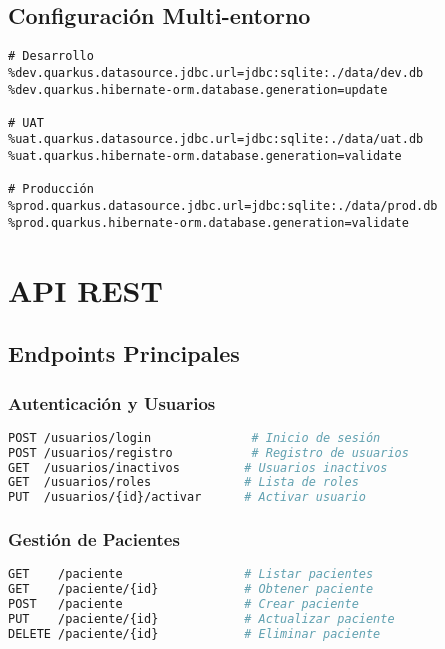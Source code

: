 \documentclass[12pt,a4paper]{article}
\begin{document}
\subsection{Configuración Multi-entorno}

\begin{lstlisting}[language=properties]
# Desarrollo
%dev.quarkus.datasource.jdbc.url=jdbc:sqlite:./data/dev.db
%dev.quarkus.hibernate-orm.database.generation=update

# UAT
%uat.quarkus.datasource.jdbc.url=jdbc:sqlite:./data/uat.db
%uat.quarkus.hibernate-orm.database.generation=validate

# Producción
%prod.quarkus.datasource.jdbc.url=jdbc:sqlite:./data/prod.db
%prod.quarkus.hibernate-orm.database.generation=validate
\end{lstlisting}

\section{API REST}

\subsection{Endpoints Principales}

\subsubsection{Autenticación y Usuarios}
\begin{lstlisting}[language=bash]
POST /usuarios/login              # Inicio de sesión
POST /usuarios/registro           # Registro de usuarios
GET  /usuarios/inactivos         # Usuarios inactivos
GET  /usuarios/roles             # Lista de roles
PUT  /usuarios/{id}/activar      # Activar usuario
\end{lstlisting}

\subsubsection{Gestión de Pacientes}
\begin{lstlisting}[language=bash]
GET    /paciente                 # Listar pacientes
GET    /paciente/{id}            # Obtener paciente
POST   /paciente                 # Crear paciente
PUT    /paciente/{id}            # Actualizar paciente
DELETE /paciente/{id}            # Eliminar paciente
\end{lstlisting}
\end{document}
